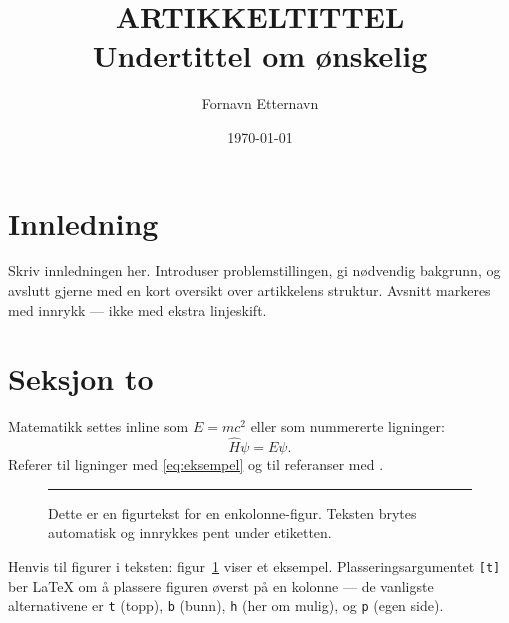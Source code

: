 \documentclass[a4paper,10pt,twocolumn]{article}
\title{ARTIKKELTITTEL\\[0.4em]
{\large Undertittel om ønskelig}}
\author{Fornavn Etternavn}
\date{\today}
\begin{document}

\section{Innledning}

Skriv innledningen her. Introduser problemstillingen, gi nødvendig bakgrunn, og avslutt gjerne med en kort oversikt over artikkelens struktur. Avsnitt markeres med innrykk --- ikke med ekstra linjeskift.

\section{Seksjon to}

Matematikk settes inline som $E = mc^2$ eller som nummererte ligninger:
\begin{equation}
  \hat{H}\psi = E\psi.
  \label{eq:eksempel}
\end{equation}
Referer til ligninger med \eqref{eq:eksempel} og til referanser med \cite{eksempel2024}.

\begin{figure}[t]
  \centering
  \rule{0.9\linewidth}{3cm}     %
  \caption{Dette er en figurtekst for en enkolonne-figur.
           Teksten brytes automatisk og innrykkes pent under etiketten.}
  \label{fig:enkel}
\end{figure}

Henvis til figurer i teksten: figur~\ref{fig:enkel} viser et eksempel. Plasseringsargumentet \texttt{[t]} ber LaTeX om å plassere figuren øverst på en kolonne --- de vanligste alternativene er \texttt{t} (topp), \texttt{b} (bunn), \texttt{h} (her om mulig), og \texttt{p} (egen side).
\end{document}
